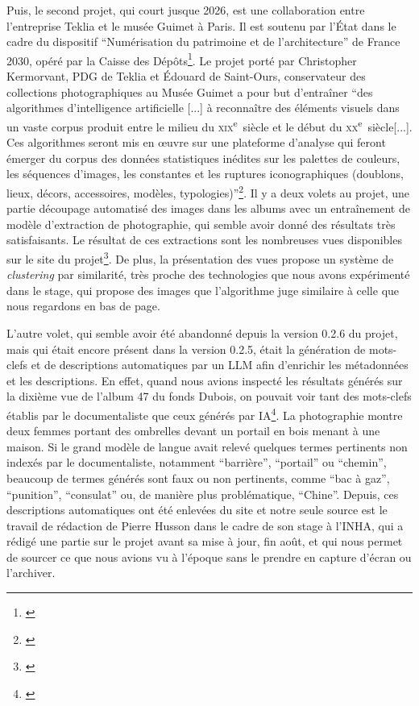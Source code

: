 Puis, le second projet, qui court jusque 2026, est une collaboration entre l'entreprise Teklia et le musée Guimet à Paris. Il est soutenu par l’État dans le cadre du dispositif \enquote{Numérisation du patrimoine et de l’architecture} de France 2030, opéré par la Caisse des Dépôts\footnote{\cite{noauthor_projet_nodate}}. Le projet porté par Christopher Kermorvant, PDG de Teklia et Édouard de Saint-Ours, conservateur des collections photographiques au Musée Guimet a pour but d'entraîner \enquote{des algorithmes d’intelligence artificielle [...] à reconnaître des éléments visuels dans un vaste corpus produit entre le milieu du \textsc{xix}\textsuperscript{e}~siècle et le début du \textsc{xx}\textsuperscript{e}~siècle[...]. Ces algorithmes seront mis en œuvre sur une plateforme d’analyse qui feront émerger du corpus des données statistiques inédites sur les palettes de couleurs, les séquences d’images, les constantes et les ruptures iconographiques (doublons, lieux, décors, accessoires, modèles, typologies)}\footnote{\cite{noauthor_projet_nodate}}. Il y a deux volets au projet, une partie découpage automatisé des images dans les albums avec un entraînement de modèle d'extraction de photographie, qui semble avoir donné des résultats très satisfaisants. Le résultat de ces extractions sont les nombreuses vues disponibles sur le site du projet\footnote{\cite{noauthor_hikaria_nodate-1}}. De plus, la présentation des vues propose un système de \textit{clustering} par similarité, très proche des technologies que nous avons expérimenté dans le stage, qui propose des images que l'algorithme juge similaire à celle que nous regardons en bas de page.

L'autre volet, qui semble avoir été abandonné depuis la version 0.2.6 du projet, mais qui était encore présent dans la version 0.2.5, était la génération de mots-clefs et de descriptions automatiques par un LLM afin d'enrichir les métadonnées et les descriptions. En effet, quand nous avions inspecté les résultats générés sur la dixième vue de l'album 47 du fonds Dubois, on pouvait voir tant des mots-clefs établis par le documentaliste que ceux générés par IA\footnote{\cite{noauthor_hikaria_nodate}}. La photographie montre deux femmes portant des ombrelles devant un portail en bois menant à une maison. Si le grand modèle de langue avait relevé quelques termes pertinents non indexés par le documentaliste, notamment \enquote{barrière}, \enquote{portail} ou \enquote{chemin}, beaucoup de termes générés sont faux ou non pertinents, comme \enquote{bac à gaz}, \enquote{punition}, \enquote{consulat} ou, de manière plus problématique, \enquote{Chine}. Depuis, ces descriptions automatiques ont été enlevées du site et notre seule source est le travail de rédaction de Pierre Husson dans le cadre de son stage à l'INHA, qui a rédigé une partie sur le projet avant sa mise à jour, fin août, et qui nous permet de sourcer ce que nous avions vu à l'époque sans le prendre en capture d'écran ou l'archiver. 

